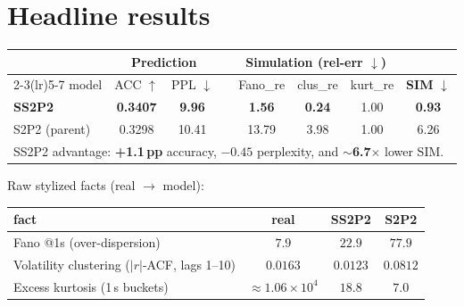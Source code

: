 \documentclass[11pt]{article}
\begin{document}
\section{Headline results}
\begin{center}\renewcommand{\arraystretch}{1.3}
\begin{tabular}{l cc c ccc c}
\toprule
 & \multicolumn{2}{c}{\textbf{Prediction}} & & \multicolumn{3}{c}{\textbf{Simulation} (rel-err $\downarrow$)} & \\
\cmidrule(lr){2-3}\cmidrule(lr){5-7}
model & ACC $\uparrow$ & PPL $\downarrow$ & & Fano\_re & clus\_re & kurt\_re & \textbf{SIM} $\downarrow$\\
\midrule
\textbf{SS2P2} & \textbf{0.3407} & \textbf{9.96} & & \textbf{1.56} & \textbf{0.24} & 1.00 & \textbf{0.93}\\
S2P2 (parent) & 0.3298 & 10.41 & & 13.79 & 3.98 & 1.00 & 6.26\\
\midrule
\multicolumn{8}{l}{\footnotesize SS2P2 advantage: \textbf{+1.1\,pp} accuracy, $-0.45$ perplexity, and \textbf{$\sim$6.7$\times$} lower SIM.}\\
\bottomrule
\end{tabular}
\end{center}

\noindent Raw stylized facts (real $\to$ model):
\begin{center}\small\renewcommand{\arraystretch}{1.15}
\begin{tabular}{lccc}
\toprule
fact & real & SS2P2 & S2P2\\
\midrule
Fano @1s (over-dispersion) & $7.9$ & $\mathbf{22.9}$ & $77.9$\\
Volatility clustering ($|r|$-ACF, lags 1--10) & $0.0163$ & $\mathbf{0.0123}$ & $0.0812$\\
Excess kurtosis (1\,s buckets) & $\approx\!1.06\times10^4$ & $18.8$ & $7.0$\\
\bottomrule
\end{tabular}
\end{center}
\end{document}
